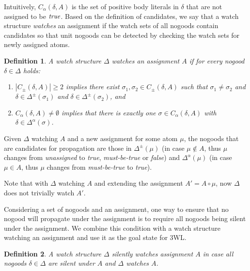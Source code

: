 \documentclass{vutinfth} %
\newtheorem{definition}{Definition}[chapter]
\newcommand{\mbt}{must-be-true\xspace}
\newcommand{\ass}{A}
\newcommand{\cdpm}{C_\pm}
\newcommand{\cdal}{C_\alpha}
\newcommand{\dpm}{\Delta^\pm}
\newcommand{\dal}{\Delta^\alpha}
\newcommand{\lowinv}{watches\xspace}
\newcommand{\sgl}{\mu}
\newcommand{\bsgl}{\sigma}
\begin{document}
Intuitively, $C_\alpha(\delta, A)$ is the set of positive body literals in $\delta$ that are not assigned to be $\emph{true}$. Based on the definition of candidates, we say that a watch structure \emph{watches} an assignment if the watch sets of all nogoods contain candidates so that unit nogoods can be detected by checking the watch sets for newly assigned atoms.

\begin{definition}
A watch structure $\Delta$ \emph{\lowinv} an assignment $\ass$ if for every nogood $\delta \in \Delta$ holds:

\begin{enumerate}
\item $|\cdpm(\delta, A)| \geq 2$ implies there exist $\bsgl_1, \bsgl_2 \in \cdpm(\delta, A)$ such that $\bsgl_1 \not = \bsgl_2$ and $\delta \in \dpm(\bsgl_1)$ and $\delta \in \dpm(\bsgl_2)$, and
\item $\cdal(\delta, A) \not = \emptyset$ implies that there is exactly one $\bsgl \in \cdal(\delta, A)$ with $\delta \in \dal(\bsgl)$.
\end{enumerate}
\end{definition}

Given $\Delta$ watching $\ass$ and a new assignment for some atom $\sgl$, the nogoods that are candidates for propagation are those in $\dpm(\sgl)$ (in case $\sgl \not \in A$, thus $\sgl$ changes from \emph{unassigned} to \emph{true}, \emph{\mbt} or \emph{false}) and $\dal(\sgl)$ (in case $\sgl \in A$, thus $\sgl$ changes from \emph{\mbt} to \emph{true}).

Note that with $\Delta$ watching $\ass$ and extending the assignment $\ass' = \ass \circ \sgl$, now $\Delta$ does not trivially watch $\ass'$.

Considering a set of nogoods and an assignment, one way to ensure that no nogood will propagate under the assignment is to require all nogoods being silent under the assignment. We combine this condition with a watch structure watching an assignment and use it as the goal state for 3WL.

\begin{definition}
A watch structure $\Delta$ \emph{silently watches} assignment $\ass$ in case all nogoods $\delta \in \Delta$ are silent under $\ass$ and $\Delta$ watches $\ass$.
\end{definition}
\end{document}
